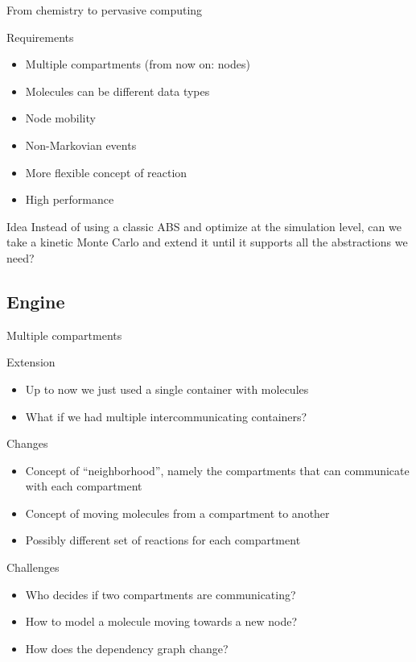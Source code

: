 \documentclass[presentation]{beamer}
\begin{document}
\begin{frame}{From chemistry to pervasive computing}
 \begin{block}{Requirements}
  \begin{itemize}
   \item Multiple compartments (from now on: nodes)
   \item Molecules can be different data types
   \item Node mobility
   \item Non-Markovian events
   \item More flexible concept of reaction
   \item High performance
  \end{itemize}
 \end{block}
 \begin{block}{Idea}
  Instead of using a classic ABS and optimize at the simulation level, can we take a kinetic Monte Carlo and extend it until it supports all the abstractions we need?
 \end{block}
\end{frame}

\subsection{Engine}

\begin{frame}{Multiple compartments}
 \begin{block}{Extension}
  \begin{itemize}
   \item Up to now we just used a single container with molecules
   \item What if we had multiple intercommunicating containers?
  \end{itemize}
 \end{block}
 \begin{block}{Changes}
  \begin{itemize}
   \item Concept of ``neighborhood'', namely the compartments that can communicate with each compartment
   \item Concept of moving molecules from a compartment to another
   \item Possibly different set of reactions for each compartment
  \end{itemize}
 \end{block}
 \begin{block}{Challenges}
  \begin{itemize}
   \item Who decides if two compartments are communicating?
   \item How to model a molecule moving towards a new node?
   \item How does the dependency graph change?
  \end{itemize}
 \end{block}
\end{frame}
\end{document}
